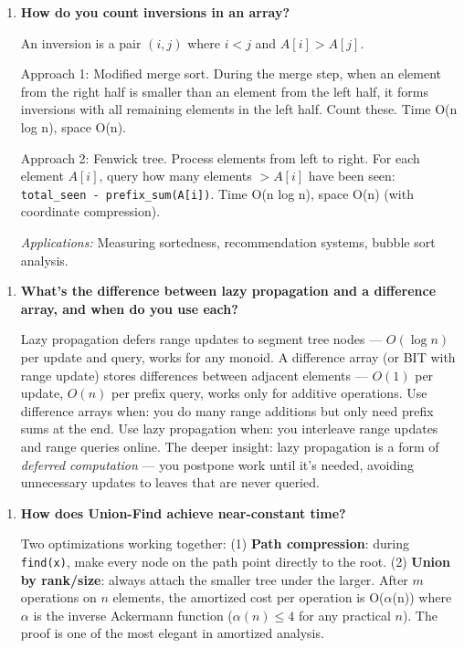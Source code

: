 \begin{enumerate}
\item \textbf{How do you count inversions in an array?}

An inversion is a pair $(i, j)$ where $i < j$ and $A[i] > A[j]$. 

Approach 1: Modified merge sort. During the merge step, when an element from the right half is smaller than an element from the left half, it forms inversions with all remaining elements in the left half. Count these. Time O(n log n), space O(n).

Approach 2: Fenwick tree. Process elements from left to right. For each element $A[i]$, query how many elements $> A[i]$ have been seen: \texttt{total\_seen - prefix\_sum(A[i])}. Time O(n log n), space O(n) (with coordinate compression).

\textit{Applications:} Measuring sortedness, recommendation systems, bubble sort analysis.
\end{enumerate}

\begin{enumerate}
\item \textbf{What's the difference between lazy propagation and a difference array, and when do you use each?}

Lazy propagation defers range updates to segment tree nodes --- $O(\log n)$ per update and query, works for any monoid. A difference array (or BIT with range update) stores differences between adjacent elements --- $O(1)$ per update, $O(n)$ per prefix query, works only for additive operations. Use difference arrays when: you do many range additions but only need prefix sums at the end. Use lazy propagation when: you interleave range updates and range queries online. The deeper insight: lazy propagation is a form of \textit{deferred computation} --- you postpone work until it's needed, avoiding unnecessary updates to leaves that are never queried.
\end{enumerate}

\begin{enumerate}
\item \textbf{How does Union-Find achieve near-constant time?}

Two optimizations working together: (1) \textbf{Path compression}: during \texttt{find(x)}, make every node on the path point directly to the root. (2) \textbf{Union by rank/size}: always attach the smaller tree under the larger. After $m$ operations on $n$ elements, the amortized cost per operation is O($\alpha$(n)) where $\alpha$ is the inverse Ackermann function ($\alpha(n) \leq 4$ for any practical $n$). The proof is one of the most elegant in amortized analysis.
\end{enumerate}

